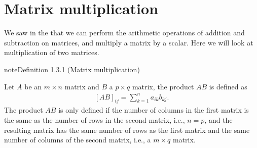 \documentclass[letterpaper,10pt,english]{jupyterBook}
\begin{document}
\section{Matrix multiplication}
\label{\detokenize{_pages/1.2_Matrix_multiplication:matrix-multiplication}}\label{\detokenize{_pages/1.2_Matrix_multiplication:index-0}}\label{\detokenize{_pages/1.2_Matrix_multiplication:matrix-multiplication-section}}\label{\detokenize{_pages/1.2_Matrix_multiplication::doc}}
\sphinxAtStartPar
We saw in the {\hyperref[\detokenize{_pages/1.1_Matrix_operations:matrix-operations-section}]{}} that we can perform the arithmetic operations of addition and subtraction on matrices, and multiply a matrix by a scalar. Here we will look at multiplication of two matrices.
\label{_pages/1.2_Matrix_multiplication:matrix-multiplication-definition}
\begin{sphinxadmonition}{note}{Definition 1.3.1 (Matrix multiplication)}



\sphinxAtStartPar
Let \(A\) be an \(m \times n\) matrix and \(B\) a \(p \times q\) matrix, the product \(AB\) is defined as
\begin{equation}\label{equation:_pages/1.2_Matrix_multiplication:matrix-multiplication-equation}
\begin{split} [AB]_{ij} = \sum_{k=1}^n a_{ik}b_{kj}. \end{split}
\end{equation}
\sphinxAtStartPar
The product \(AB\) is only defined if the number of columns in the first matrix is the same as the number of rows in the second matrix, i.e., \(n = p\), and the resulting matrix has the same number of rows as the first matrix and the same number of columns of the second matrix, i.e., a \(m \times q\) matrix.
\end{sphinxadmonition}
\end{document}
